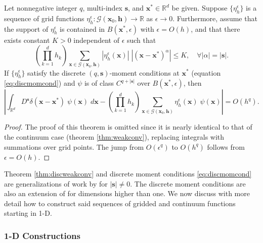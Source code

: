 \begin{theorem}\label{thm:discweakconv}
Let nonnegative integer $q$, multi-index $\mathbf s$, and $\mathbf x^*\in\mathbb R^d$ be given.
Suppose $\{\eta_h^\epsilon\}$ is a sequence of grid functions $\eta_h^\epsilon:\mathcal G(\mathbf x_0,\mathbf h)\to\mathbb R$ as $\epsilon\to 0$.
Furthermore, assume that the support of $\eta_h^\epsilon$ is contained in $B(\mathbf x^*,\epsilon)$ with $\epsilon=O(h)$, and that there exists constant $K>0$ independent of $\epsilon$ such that
\begin{equation*}\label{eq:boundh}
	\left(\prod_{k=1}^d h_k \right) \sum_{\mathbf x\in\mathcal G(\mathbf x_0,\mathbf h)} |\eta_h^\epsilon(\mathbf x)|\; |(\mathbf x-\mathbf x^*)^{\alpha}| \le K, \quad \forall |\alpha| = |\mathbf s|.
\end{equation*}
If $\{\eta_h^\epsilon\}$ satisfy the discrete $(q,\mathbf s)$-moment conditions at $\mathbf x^*$ (equation \ref{eq:discmomcond}) and $\psi$ is of class $C^{q+|\mathbf s|}$ over $B(\mathbf x^*,\epsilon)$, then 
\[
	\left| \int_{\mathbb R^d} D^{\mathbf s}\delta(\mathbf x- \mathbf x^*) \;\psi(\mathbf x)\; d\mathbf x - \left(\prod_{k=1}^d h_k\right) \sum_{\mathbf x\in\mathcal G(\mathbf x_0,\mathbf h)}\eta_h^\epsilon (\mathbf x) \; \psi(\mathbf x)\right| = O(h^q).
\]
\end{theorem}

\begin{proof}
The proof of this theorem is omitted since it is nearly identical to that of the continuum case (theorem \ref{thm:weakconv}), replacing integrals with summations over grid points.
The jump from $O(\epsilon^q)$ to $O(h^q)$ follows from $\epsilon=O(h)$.
\end{proof}

Theorem \ref{thm:discweakconv} and discrete moment conditions \ref{eq:discmomcond} are generalizations of work by \cite{TorEng:04} for $|\mathbf s|\neq 0$. 
The discrete moment conditions are also an extension of \cite{Walden:1999} for dimensions higher than one.
We now discuss with more detail how to construct said sequences of gridded and continuum functions starting in 1-D.

\subsubsection{1-D Constructions}

